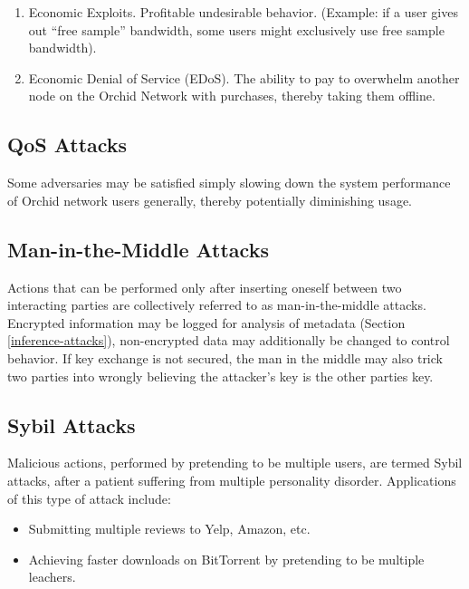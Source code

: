 \documentclass{article}
\newcommand{\orchid}{Orchid}
\newcommand{\Orchid}{\orchid}
\begin{document}
\begin{enumerate}
\item Economic Exploits. Profitable undesirable behavior. (Example: if a user gives out “free sample” bandwidth, some users might exclusively use free sample bandwidth).
\item Economic Denial of Service (EDoS). The ability to pay to overwhelm another node on the \Orchid{} Network with purchases, thereby taking them offline.
\end{enumerate}

\subsection{QoS Attacks}
\label{qos}

Some adversaries may be satisfied simply slowing down the system performance of \Orchid{} network users generally, thereby potentially diminishing usage.

\subsection{Man-in-the-Middle Attacks}
\label{mitm}

Actions that can be performed only after inserting oneself between two interacting parties are collectively referred to as man-in-the-middle attacks. Encrypted information may be logged for analysis of metadata (Section \ref{inference-attacks}), non-encrypted data may additionally be changed to control behavior. If key exchange is not secured, the man in the middle may also trick two parties into wrongly believing the attacker's key is the other parties key.

\subsection{Sybil Attacks}

Malicious actions, performed by pretending to be multiple users, are termed Sybil attacks, after a patient suffering from multiple personality disorder. Applications of this type of attack include:

\begin{itemize}
\item Submitting multiple reviews to Yelp, Amazon, etc.
\item Achieving faster downloads on BitTorrent by pretending to be multiple leachers\cite{freeridingBittorrent}.
\end{itemize}
\end{document}

